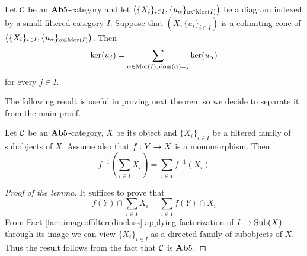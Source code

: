 \begin{theorem}\label{theorem:kernelofastructuremapinab5}
Let ${\mathcal C}$ be an $\mathbf{Ab}5$-category and let $\left(\{X_i\}_{i\in I},\{u_{\alpha}\}_{\alpha \in \mathrm{Mor}(I)}\right)$ be a diagram indexed by a small filtered category $I$. Suppose that $\left(X,\{u_i\}_{i\in I}\right)$ is a colimiting cone of $\left(\{X_i\}_{i\in I},\{u_{\alpha}\}_{\alpha \in \mathrm{Mor}(I)}\right)$. Then
$$\ker(u_j) = \sum_{\alpha \in \mathrm{Mor}(I),\,\mathrm{dom}(\alpha) = j}\ker(u_{\alpha})$$
for every $j\in I$.
\end{theorem}
\noindent
The following result is useful in proving next theorem so we decide to separate it from the main proof.

\begin{lemma}\label{lemma:ab5refinement}
Let ${\mathcal C}$ be an $\mathbf{Ab}5$-category, $X$ be its object and $\{X_i\}_{i\in I}$ be a filtered family of subobjects of $X$. Assume also that $f:Y\rightarrow X$ is a monomorphism. Then
$$f^{-1}\left(\sum_{i\in I}X_i\right) = \sum_{i\in I}f^{-1}(X_i)$$
\end{lemma}
\begin{proof}[Proof of the lemma]
It suffices to prove that 
$$f(Y)\cap \sum_{i\in I}X_i = \sum_{i\in I}f(Y)\cap X_i$$
From Fact \ref{fact:imageoffilteredinclass} applying factorization of $I\rightarrow \mathrm{Sub}(X)$ through its image we can view $\{X_i\}_{i\in I}$ as a directed family of subobjects of $X$. Thus the result follows from the fact that ${\mathcal C}$ is $\mathbf{Ab}5$.
\end{proof}


